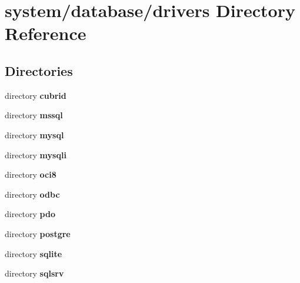 \section{system/database/drivers Directory Reference}
\label{dir_e9a3063a362e52a72a2c571924e6112b}
\subsection*{Directories}
\begin{DoxyCompactItemize}
\item 
directory {\bf cubrid}
\item 
directory {\bf mssql}
\item 
directory {\bf mysql}
\item 
directory {\bf mysqli}
\item 
directory {\bf oci8}
\item 
directory {\bf odbc}
\item 
directory {\bf pdo}
\item 
directory {\bf postgre}
\item 
directory {\bf sqlite}
\item 
directory {\bf sqlsrv}
\end{DoxyCompactItemize}

